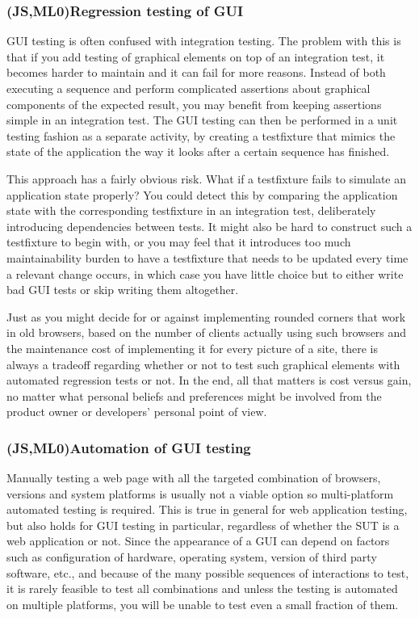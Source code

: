 \documentclass[11pt]{article}
\begin{document}
\subsubsection{(JS,ML0)Regression testing of GUI}

GUI testing is often confused with integration testing. The problem with this is that if you add testing of graphical elements on top of an integration test, it becomes harder to maintain and it can fail for more reasons. Instead of both executing a sequence and perform complicated assertions about graphical components of the expected result, you may benefit from keeping assertions simple in an integration test. The GUI testing can then be performed in a unit testing fashion as a separate activity, by creating a \gls{testfixture} that mimics the state of the application the way it looks after a certain sequence has finished.

This approach has a fairly obvious risk. What if a \gls{testfixture} fails to simulate an application state properly? You could detect this by comparing the application state with the corresponding \gls{testfixture} in an integration test, deliberately introducing dependencies between tests. It might also be hard to construct such a \gls{testfixture} to begin with, or you may feel that it introduces too much maintainability burden to have a \gls{testfixture} that needs to be updated every time a relevant change occurs, in which case you have little choice but to either write bad GUI tests or skip writing them altogether.

Just as you might decide for or against implementing rounded corners that work in old browsers, based on the number of clients actually using such browsers and the maintenance cost of implementing it for every picture of a site, there is always a tradeoff regarding whether or not to test such graphical elements with automated regression tests or not. In the end, all that matters is cost versus gain, no matter what personal beliefs and preferences might be involved from the product owner or developers' personal point of view. \cite[questions~40-44]{Ahnve}

\subsubsection{(JS,ML0)Automation of GUI testing}

Manually testing a web page with all the targeted combination of browsers, versions and system platforms is usually not a viable option \cite{TestSwarm} so multi-platform automated testing is required. This is true in general for web application testing, but also holds for GUI testing in particular, regardless of whether the SUT is a web application or not. Since the appearance of a GUI can depend on factors such as configuration of hardware, operating system, version of third party software, etc., and because of the many possible sequences of interactions to test, it is rarely feasible to test all combinations and unless the testing is automated on multiple platforms, you will be unable to test even a small fraction of them.
\end{document}
